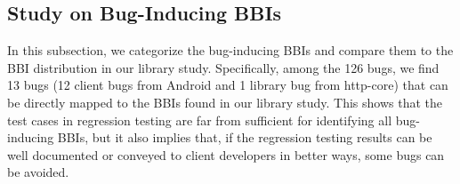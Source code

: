 


\subsection{Study on Bug-Inducing BBIs}

In this subsection, we categorize the bug-inducing BBIs and compare them to the BBI distribution in our library study. Specifically, among the 126 bugs, we find 13 bugs (12 client bugs from Android and 1 library bug from http-core) that can be directly mapped to the BBIs found in our library study. This shows that the test cases in regression testing are far from sufficient for identifying all bug-inducing BBIs, but it also implies that, if the regression testing results can be well documented or conveyed to client developers in better ways, some bugs can be avoided. 



